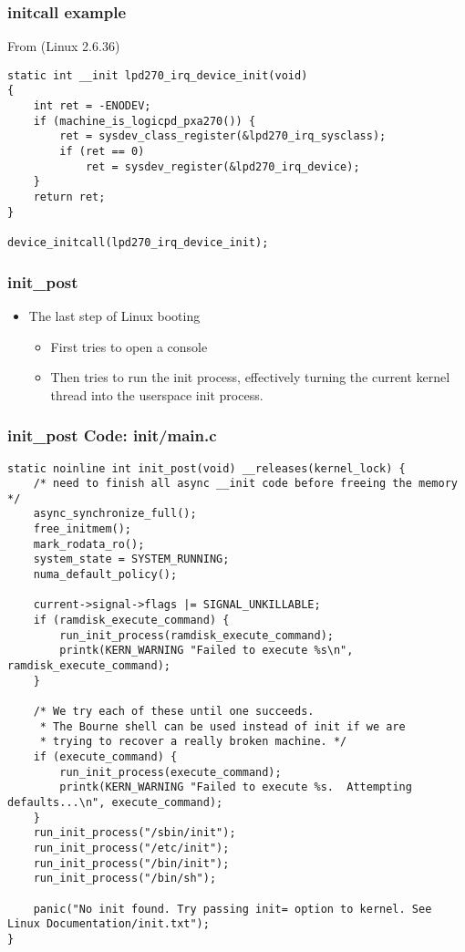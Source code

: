 \begin{frame}[fragile]
  \frametitle{initcall example}
From  (Linux 2.6.36)
\begin{verbatim}
static int __init lpd270_irq_device_init(void)
{
    int ret = -ENODEV;
    if (machine_is_logicpd_pxa270()) {
        ret = sysdev_class_register(&lpd270_irq_sysclass);
        if (ret == 0)
            ret = sysdev_register(&lpd270_irq_device);
    }
    return ret;
}

device_initcall(lpd270_irq_device_init);
\end{verbatim}
\end{frame}

\begin{frame}
  \frametitle{init\_post}
  \begin{itemize}
  \item The last step of Linux booting
    \begin{itemize}
    \item First tries to open a console
    \item Then tries to run the init process, effectively turning the
      current kernel thread into the userspace init process.
    \end{itemize}
  \end{itemize}
\end{frame}

\begin{frame}[fragile]
  \frametitle{init\_post Code: init/main.c}
\begin{verbatim}
static noinline int init_post(void) __releases(kernel_lock) {
    /* need to finish all async __init code before freeing the memory */
    async_synchronize_full();
    free_initmem();
    mark_rodata_ro();
    system_state = SYSTEM_RUNNING;
    numa_default_policy();

    current->signal->flags |= SIGNAL_UNKILLABLE;
    if (ramdisk_execute_command) {
        run_init_process(ramdisk_execute_command);
        printk(KERN_WARNING "Failed to execute %s\n", ramdisk_execute_command);
    }

    /* We try each of these until one succeeds.
     * The Bourne shell can be used instead of init if we are
     * trying to recover a really broken machine. */
    if (execute_command) {
        run_init_process(execute_command);
        printk(KERN_WARNING "Failed to execute %s.  Attempting defaults...\n", execute_command);
    }
    run_init_process("/sbin/init");
    run_init_process("/etc/init");
    run_init_process("/bin/init");
    run_init_process("/bin/sh");

    panic("No init found. Try passing init= option to kernel. See Linux Documentation/init.txt");
}
\end{verbatim}
\end{frame}

